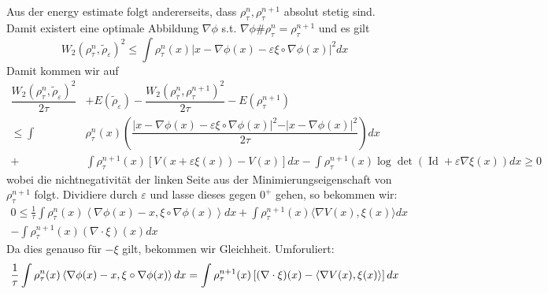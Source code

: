 \documentclass[11pt,a4paper,notitlepage]{scrreprt}
\begin{document}
Aus der energy estimate folgt andererseits, dass $\rho_\tau^n, \rho_\tau^{n+1}$ absolut stetig sind. Damit existert eine optimale Abbildung $\nabla \phi$ s.t. $\nabla \phi \# \rho_\tau^n=\rho_\tau^{n+1}$ und es gilt
\begin{equation*}
W_2(\rho_\tau^n,\tilde{\rho}_\varepsilon)^2 \leq \int \rho_\tau^n(x)\vert x-\nabla \phi(x)-\varepsilon\xi\circ\nabla\phi(x)\vert^2dx
\end{equation*}
Damit kommen wir auf
\begin{align}
\dfrac{W_2(\rho_\tau^n,\tilde{\rho}_\varepsilon)^2}{2\tau}&+E(\tilde{\rho}_\varepsilon)-\dfrac{W_2(\rho_\tau^n,\rho_\tau^{n+1})^2}{2\tau}-E(\rho_\tau^{n+1})\\
\leq\int&\rho_\tau^n(x)\left(\dfrac{\vert x-\nabla \phi(x)-\varepsilon\xi\circ\nabla\phi(x)\vert^2-\vert x-\nabla\phi(x)\vert^2}{2\tau}\right)dx\\
+&\int\rho_\tau^{n+1}(x)[V(x+\varepsilon\xi(x))-V(x)]dx-\int\rho_\tau^{n+1}(x)\log \det(\operatorname{Id}+\varepsilon\nabla\xi(x))dx\geq 0
\end{align}
wobei die nichtnegativität der linken Seite aus der Minimierungseigenschaft von $\rho_\tau^{n+1}$ folgt.
Dividiere durch $\varepsilon$ und lasse dieses gegen $0^+$ gehen, so bekommen wir: 
\begin{align*}
0\leq\frac{1}{\tau} \int \rho_\tau^n(x)\left\langle\nabla\phi(x)-x,\xi\circ\nabla\phi(x)\right\rangle dx+\int\rho_\tau^{n+1}(x)\langle\nabla V(x),\xi(x)\rangle dx\\-\int\rho_\tau^{n+1}(x)(\nabla\cdot \xi)(x)dx
\end{align*}
Da dies genauso für $-\xi$ gilt, bekommen wir Gleichheit. Umforuliert:
\begin{equation}
\frac{1}{\tau} \int \rho_\tau^n(x)\left\langle\nabla\phi(x)-x,\xi\circ\nabla\phi(x)\right\rangle dx\\=\int\rho_\tau^{n+1}(x)\left[(\nabla\cdot \xi)(x)-\langle\nabla V(x),\xi(x)\rangle \right]dx \label{eqwithxi}
\end{equation}
\end{document}
